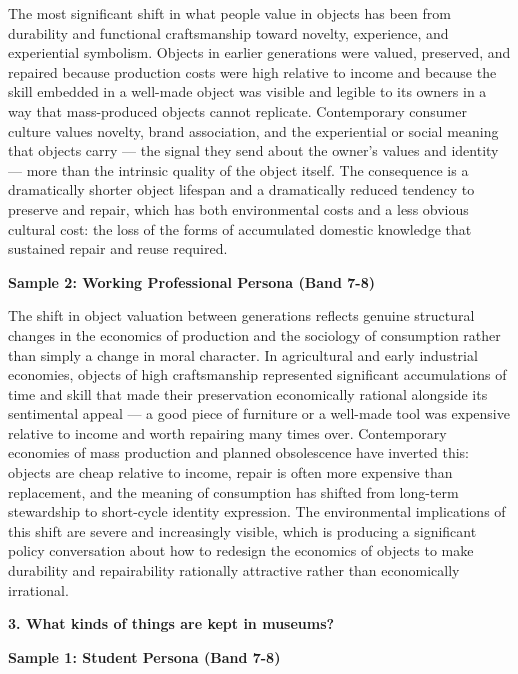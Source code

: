 The most significant shift in what people value in objects has been from durability and functional craftsmanship toward novelty, experience, and experiential symbolism. Objects in earlier generations were valued, preserved, and repaired because production costs were high relative to income and because the skill embedded in a well-made object was visible and legible to its owners in a way that mass-produced objects cannot replicate. Contemporary consumer culture values novelty, brand association, and the experiential or social meaning that objects carry — the signal they send about the owner's values and identity — more than the intrinsic quality of the object itself. The consequence is a dramatically shorter object lifespan and a dramatically reduced tendency to preserve and repair, which has both environmental costs and a less obvious cultural cost: the loss of the forms of accumulated domestic knowledge that sustained repair and reuse required.

\textbf{Sample 2: Working Professional Persona (Band 7-8)}

The shift in object valuation between generations reflects genuine structural changes in the economics of production and the sociology of consumption rather than simply a change in moral character. In agricultural and early industrial economies, objects of high craftsmanship represented significant accumulations of time and skill that made their preservation economically rational alongside its sentimental appeal — a good piece of furniture or a well-made tool was expensive relative to income and worth repairing many times over. Contemporary economies of mass production and planned obsolescence have inverted this: objects are cheap relative to income, repair is often more expensive than replacement, and the meaning of consumption has shifted from long-term stewardship to short-cycle identity expression. The environmental implications of this shift are severe and increasingly visible, which is producing a significant policy conversation about how to redesign the economics of objects to make durability and repairability rationally attractive rather than economically irrational.

\separator

\begin{ieltsquestion}
\textbf{3. What kinds of things are kept in museums?}
\end{ieltsquestion}
\textbf{Sample 1: Student Persona (Band 7-8)}

